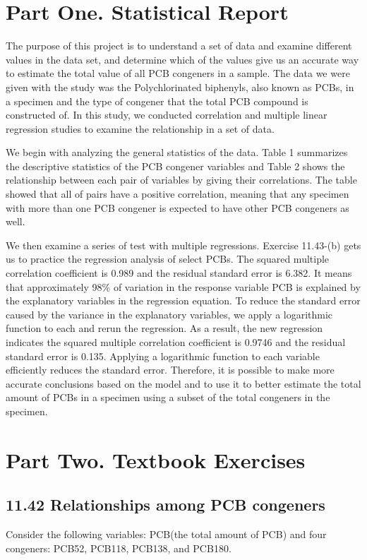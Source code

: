 \documentclass[11pt]{article}
\author{Mijeong Ban}
\date{\today}
\title{}
\begin{document}
\section*{Part One. Statistical Report}
\label{sec:org3cdd779}

The purpose of this project is to understand a set of data and examine different values in the data set, and determine which of the values give us an accurate way to estimate the total value of all PCB congeners in a sample. The data we were given with the study was the Polychlorinated biphenyls, also known as PCBs, in a specimen and the type of congener that the total PCB compound is constructed of. In this study, we conducted correlation and multiple linear regression studies to examine the relationship in a set of data. 

We begin with analyzing the general statistics of the data. Table 1 summarizes the descriptive statistics of the PCB congener variables and Table 2 shows the relationship between each pair of variables by giving their correlations. The table showed that all of pairs have a positive correlation, meaning that any specimen with more than one PCB congener is expected to have other PCB congeners as well. 

We then examine a series of test with multiple regressions. Exercise 11.43-(b) gets us to practice the regression analysis of select PCBs. The squared multiple correlation coefficient is 0.989 and the residual standard error is 6.382. It means that approximately 98\% of variation in the response variable PCB is explained by the explanatory variables in the regression equation. To reduce the standard error caused by the variance in the explanatory variables, we apply a logarithmic function to each and rerun the regression. As a result, the new regression indicates the squared multiple correlation coefficient is 0.9746 and the residual standard error is 0.135. Applying a logarithmic function to each variable efficiently reduces the standard error. Therefore, it is possible to make more accurate conclusions based on the model and to use it to better estimate the total amount of PCBs in a specimen using a subset of the total congeners in the specimen.  

\section*{Part Two. Textbook Exercises}
\label{sec:org7aceb68}
\subsection*{11.42 Relationships among PCB congeners}
\label{sec:orgad7cf35}
Consider the following variables: PCB(the total amount of PCB) and four congeners: PCB52, PCB118, PCB138, and PCB180.
\end{document}

